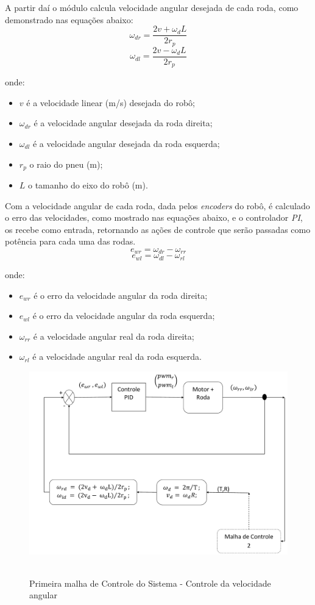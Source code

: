 A partir daí o módulo calcula velocidade angular desejada de cada roda, como demonstrado nas equações abaixo:
\begin{equation}
\omega_{dr} = \dfrac{2v + \omega_{d}L}{2r_{p}}	
\label{eq:velocangulardireita}
\end{equation} 
\begin{equation}
\omega_{dl} = \dfrac{2v - \omega_{d}L}{2r_{p}}	
\label{eq:velocangularesquerda}
\end{equation} 

onde:
\begin{itemize}
	\item $v$ é a velocidade linear (m/s) desejada do robô;
	\item $\omega_{dr}$ é a velocidade angular desejada da roda direita;
	\item $\omega_{dl}$ é a velocidade angular desejada da roda esquerda;
	\item $r_{p}$ o raio do pneu (m);
	\item $L$ o tamanho do eixo do robô (m).	
\end{itemize}

Com a velocidade angular de cada roda, dada pelos \emph{encoders} do robô, é calculado o erro das velocidades, como mostrado nas equações abaixo, e o controlador \emph{PI}, os recebe como entrada, retornando as ações de controle que serão passadas como potência para cada uma das rodas.
\begin{equation}
e_{wr} = \omega_{dr} - \omega_{rr}
\label{eq:errVelAngDireita}
\end{equation} 
\begin{equation}
e_{wl} = \omega_{dl} - \omega_{rl}
\label{eq:errVelAngEsquerda}
\end{equation} 

onde:
\begin{itemize}
	\item $e_{wr}$ é o erro da velocidade angular da roda direita;
	\item $e_{wl}$ é o erro da velocidade angular da roda esquerda;
	\item $\omega_{rr}$ é a velocidade angular real da roda direita;
	\item $\omega_{rl}$ é a velocidade angular real da roda esquerda.	
\end{itemize}	

\begin{figure}[!htb]
	\centering
	\caption{Primeira malha de Controle do Sistema - Controle da velocidade angular}
	\includegraphics[width=1.0\textwidth]{./04-figuras/malha1}
	\
	\label{fig:malha1}
\end{figure}

